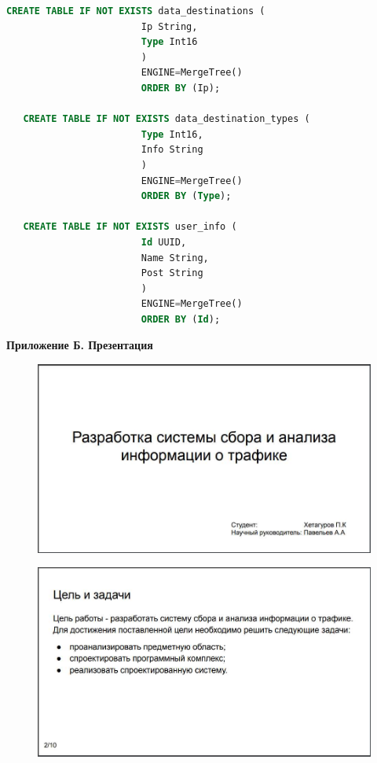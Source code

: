 \begin{lstlisting}[label={lst:appA}, language=SQL]
   CREATE TABLE IF NOT EXISTS data_destinations (
                        Ip String,
                        Type Int16
                        )
                        ENGINE=MergeTree()
                        ORDER BY (Ip);
                       
   CREATE TABLE IF NOT EXISTS data_destination_types (
                        Type Int16,
                        Info String
                        )
                        ENGINE=MergeTree()
                        ORDER BY (Type);
                       
   CREATE TABLE IF NOT EXISTS user_info (
                        Id UUID,
                        Name String,
                        Post String
                        )
                        ENGINE=MergeTree()
                        ORDER BY (Id);
\end{lstlisting}
 \newpage
{}
 {\centering\textbf{Приложение Б. Презентация} \par}
\begin{figure}[H]
	\centering
	\includegraphics[scale=0.35]{pr1.jpg}
\end{figure}
\begin{figure}[H]
	\centering
	\includegraphics[scale=0.35]{pr2.jpg}
\end{figure}
